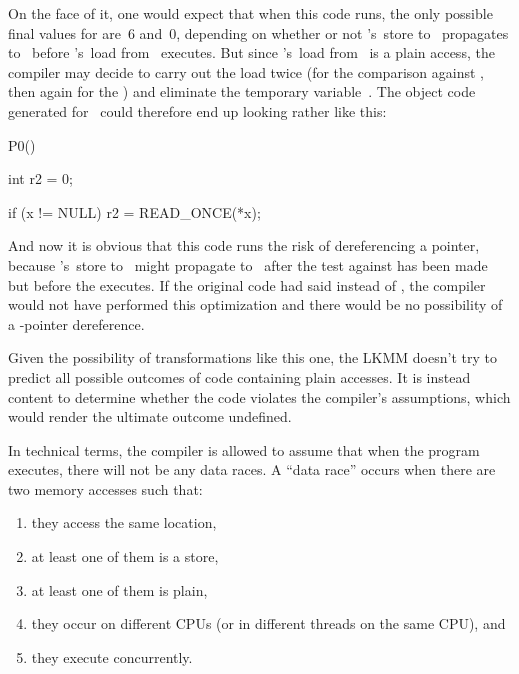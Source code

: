 On the face of it, one would expect that when this code runs, the only
possible final values for  are~6 and~0, depending on whether or not
's~store to~ propagates to~ before 's~load
from~ executes.
But since 's~load from~ is a plain access, the compiler may decide
to carry out the load twice (for the comparison against , then again
for the ) and eliminate the temporary variable~.
The object code generated for~ could therefore end up looking rather
like this:

\begin{VerbatimU}
	P0()
	{
		int r2 = 0;

		if (x != NULL)
			r2 = READ_ONCE(*x);
	}
\end{VerbatimU}

And now it is obvious that this code runs the risk of dereferencing a
 pointer, because 's~store to~ might propagate
to~ after the
test against  has been made but before the  executes.
If the original code had said  instead of ,
the compiler would not have performed this optimization and there
would be no possibility of a -pointer dereference.

Given the possibility of transformations like this one, the LKMM
doesn't try to predict all possible outcomes of code containing plain
accesses.
It is instead content to determine whether the code
violates the compiler's assumptions, which would render the ultimate
outcome undefined.

In technical terms, the compiler is allowed to assume that when the
program executes, there will not be any data races.
A ``data race''
occurs when there are two memory accesses such that:

\begin{enumerate}
\item	they access the same location,

\item	at least one of them is a store,

\item	at least one of them is plain,

\item	they occur on different CPUs (or in different threads on the
	same CPU), and

\item	they execute concurrently.
\end{enumerate}

